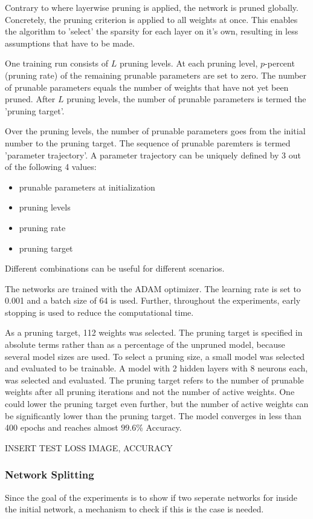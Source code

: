 Contrary to \autocite{DBLP:conf/iclr/FrankleC19} where layerwise pruning is applied, the network is pruned globally.
Concretely, the pruning criterion is applied to all weights at once.
This enables the algorithm to 'select' the sparsity for each layer on it's own, resulting in less assumptions that have to be made.

One training run consists of $L$ pruning levels. 
At each pruning level, $p$-percent (pruning rate) of the remaining prunable parameters are set to zero.
The number of prunable parameters equals the number of weights that have not yet been pruned.
After $L$ pruning levels, the number of prunable parameters is termed the 'pruning target'.

Over the pruning levels, the number of prunable parameters goes from the initial number to the pruning target.
The sequence of prunable paremters is termed 'parameter trajectory'.
A parameter trajectory can be uniquely defined by 3 out of the following 4 values:
\begin{itemize}
    \item prunable parameters at initialization
    \item pruning levels
    \item pruning rate
    \item pruning target
\end{itemize}

Different combinations can be useful for different scenarios.

The networks are trained with the ADAM optimizer.
The learning rate is set to 0.001 and a batch size of 64 is used.
Further, throughout the experiments, early stopping is used to reduce the computational time.

As a pruning target, 112 weights was selected.
The pruning target is specified in absolute terms rather than as a percentage of the unpruned model, because several model sizes are used.
To select a pruning size, a small model was selected and evaluated to be trainable.
A model with 2 hidden layers with 8 neurons each, was selected and evaluated.
The pruning target refers to the number of prunable weights after all pruning iterations and not the number of active weights.
One could lower the pruning target even further, but the number of active weights can be significantly lower than the pruning target.
The model converges in less than 400 epochs and reaches almost $99.6$\% Accuracy.

INSERT TEST LOSS IMAGE, ACCURACY


\subsubsection{Network Splitting}
Since the goal of the experiments is to show if two seperate networks for inside the initial network, a mechanism to check if this is the case is needed.

